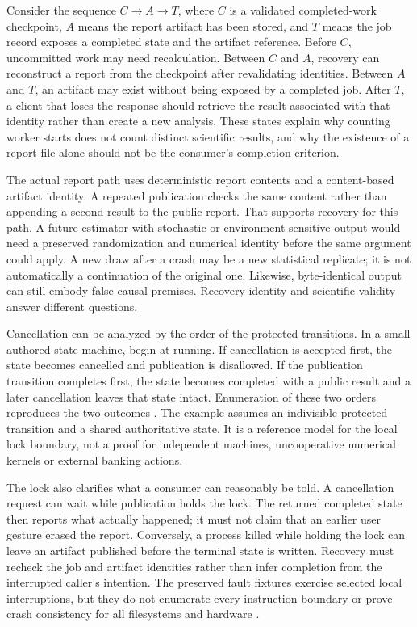 Consider the sequence $C\to A\to T$, where $C$ is a validated completed-work
checkpoint, $A$ means the report artifact has been stored, and $T$ means the
job record exposes a completed state and the artifact reference. Before $C$,
uncommitted work may need recalculation. Between $C$ and $A$, recovery can
reconstruct a report from the checkpoint after revalidating identities.
Between $A$ and $T$, an artifact may exist without being exposed by a
completed job. After $T$, a client that loses the response should retrieve
the result associated with that identity rather than create a new analysis.
These states explain why counting worker starts does not count distinct
scientific results, and why the existence of a report file alone should not
be the consumer's completion criterion.

The actual report path uses deterministic report contents and a content-based
artifact identity. A repeated publication checks the same content rather
than appending a second result to the public report. That supports recovery
for this path. A future estimator with stochastic or environment-sensitive
output would need a preserved randomization and numerical identity before
the same argument could apply. A new draw after a crash may be a new
statistical replicate; it is not automatically a continuation of the original
one. Likewise, byte-identical output can still embody false causal premises.
Recovery identity and scientific validity answer different questions.

Cancellation can be analyzed by the order of the protected transitions. In a
small authored state machine, begin at running. If cancellation is accepted
first, the state becomes cancelled and publication is disallowed. If the
publication transition completes first, the state becomes completed with a
public result and a later cancellation leaves that state intact. Enumeration
of these two orders reproduces the two outcomes
\citep{exec17_integration_review_reference}. The example assumes an indivisible
protected transition and a shared authoritative state. It is a reference
model for the local lock boundary, not a proof for independent machines,
uncooperative numerical kernels or external banking actions.

The lock also clarifies what a consumer can reasonably be told. A cancellation
request can wait while publication holds the lock. The returned completed
state then reports what actually happened; it must not claim that an earlier
user gesture erased the report. Conversely, a process killed while holding
the lock can leave an artifact published before the terminal state is
written. Recovery must recheck the job and artifact identities rather than
infer completion from the interrupted caller's intention. The preserved
fault fixtures exercise selected local interruptions, but they do not
enumerate every instruction boundary or prove crash consistency for all
filesystems and hardware \citep{exec13_ops_faults}.

